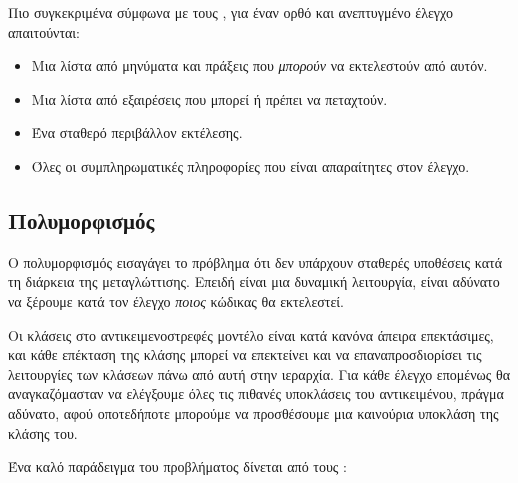 \documentclass[12pt]{article}
\begin{document}
\par Πιο συγκεκριμένα σύμφωνα με τους \textcite{gordon}, για έναν ορθό και ανεπτυγμένο έλεγχο απαιτούνται:

\begin{itemize}
\item Μια λίστα από μηνύματα και πράξεις που \textit{μπορούν} να εκτελεστούν από αυτόν.
\item Μια λίστα από εξαιρέσεις που μπορεί ή πρέπει να πεταχτούν.
\item Ένα σταθερό περιβάλλον εκτέλεσης.
\item Όλες οι συμπληρωματικές πληροφορίες που είναι απαραίτητες στον έλεγχο.
\end{itemize}

\subsection{Πολυμορφισμός}

\par Ο πολυμορφισμός εισαγάγει το πρόβλημα ότι δεν υπάρχουν σταθερές υποθέσεις κατά τη διάρκεια της μεταγλώττισης. Επειδή είναι μια δυναμική λειτουργία, είναι αδύνατο να ξέρουμε κατά τον έλεγχο \textit{ποιος} κώδικας θα εκτελεστεί.

\par Οι κλάσεις στο αντικειμενοστρεφές μοντέλο είναι κατά κανόνα άπειρα επεκτάσιμες, και κάθε επέκταση της κλάσης μπορεί να επεκτείνει και να επαναπροσδιορίσει τις λειτουργίες των κλάσεων πάνω από αυτή στην ιεραρχία. Για κάθε έλεγχο επομένως θα αναγκαζόμασταν να ελέγξουμε όλες τις πιθανές υποκλάσεις του αντικειμένου, πράγμα αδύνατο, αφού οποτεδήποτε μπορούμε να προσθέσουμε μια καινούρια υποκλάση της κλάσης του.

\par Ένα καλό παράδειγμα του προβλήματος δίνεται από τους \textcite{chandra}:
\end{document}
